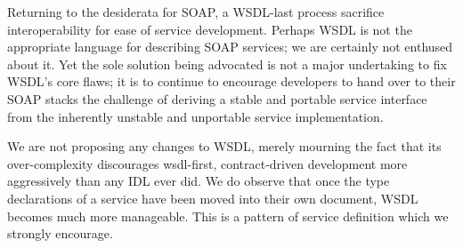 Returning to the desiderata for SOAP, a WSDL-last process sacrifice
interoperability for ease of service development. Perhaps WSDL is not
the appropriate language for describing SOAP services; we are certainly
not enthused about it. Yet the sole solution being advocated is not a
major undertaking to fix WSDL's core flaws; it is to continue to
encourage developers to hand over to their SOAP stacks the challenge of
deriving a stable and portable service interface from the inherently
unstable and unportable service implementation.

We are not proposing any changes to WSDL, merely mourning the fact that its
over-complexity discourages wsdl-first, contract-driven development more
aggressively than any IDL ever did. We do observe that once the type
declarations of a service have been moved into their own document, WSDL becomes
much more manageable. This is a pattern of service definition which we strongly
encourage. 
